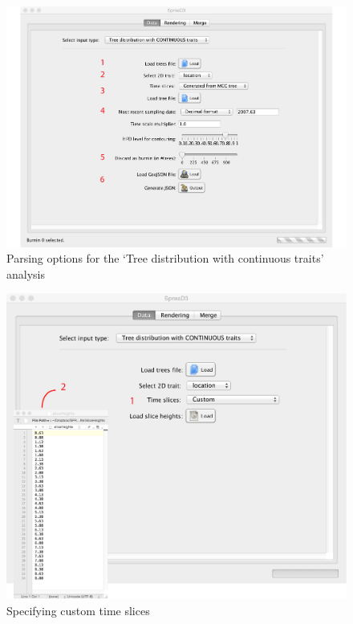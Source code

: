 \documentclass[english]{paper}
\begin{document}
\begin{figure}%
\centering
\includegraphics[width=1\textwidth]{./figures/Fig_parseTrees.pdf} 
\caption{Parsing options for the `Tree distribution with continuous traits' analysis}
\label{fig:parsePosterior}
\end{figure}

\begin{figure}%
\centering
\includegraphics[width=1\textwidth]{./figures/customTimeSlices.pdf} 
\caption{Specifying custom time slices}
\label{fig:customTimeSlices}
\end{figure}
\end{document}
